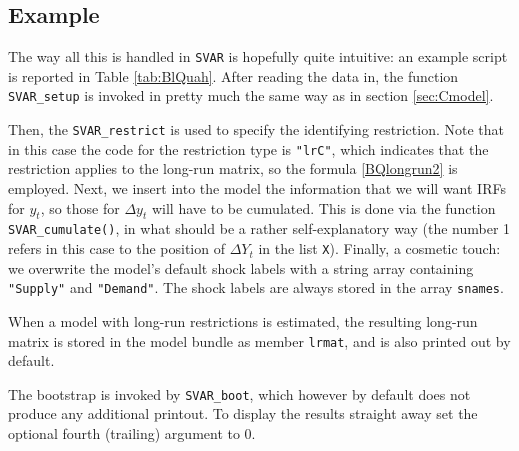\documentclass[a4paper,10pt]{article}
\newcounter{script}[section]
\begin{document}
\subsection{Example}

The way all this is handled in \texttt{SVAR} is hopefully quite
intuitive: an example script is reported in Table
\ref{tab:BlQuah}. After reading the data in, the function
\texttt{SVAR\_setup} is invoked in pretty much the same way as in
section \ref{sec:Cmodel}.

Then, the \texttt{SVAR\_restrict} is used to specify the identifying
restriction. Note that in this case the code for the restriction type
is \texttt{"lrC"}, which indicates that the restriction applies to the
long-run matrix, so the formula \eqref{BQlongrun2} is employed. Next,
we insert into the model the information that we will want IRFs for
$y_t$, so those for $\Delta y_t$ will have to be cumulated. This is
done via the function \texttt{SVAR\_cumulate()}, in what should be a
rather self-explanatory way (the number 1 refers in this case to the
position of $\Delta Y_t$ in the list \texttt{X}). Finally, a cosmetic
touch: we overwrite the model's default shock labels with a string array 
containing \texttt{"Supply"} and \texttt{"Demand"}. The shock labels
are always stored in the array \texttt{snames}. 

When a model with long-run restrictions is estimated, the resulting 
long-run matrix is stored in the model bundle as member \texttt{lrmat},
and is also printed out by default.

The bootstrap is invoked by \texttt{SVAR\_boot}, which however by default
does not produce any additional printout. To display the results 
straight away set the optional fourth (trailing) argument to 0.
\end{document}
